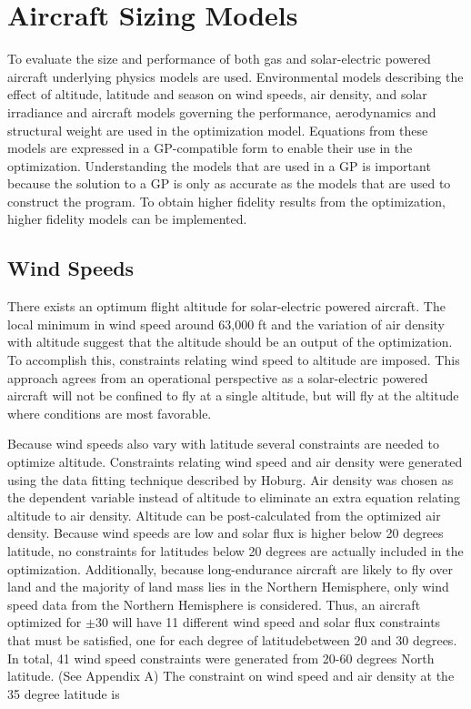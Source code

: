 \documentclass[]{aiaa-tc}%
\begin{document}
\section{Aircraft Sizing Models}

To evaluate the size and performance of both gas and solar-electric powered aircraft underlying physics models are used.  
Environmental models describing the effect of altitude, latitude and season on wind speeds, air density, and solar irradiance and aircraft models governing the performance, aerodynamics and structural weight are used in the optimization model.
Equations from these models are expressed in a GP-compatible form to enable their use in the optimization. 
Understanding the models that are used in a GP is important because the solution to a GP is only as accurate as the models that are used to construct the program.  
To obtain higher fidelity results from the optimization, higher fidelity models can be implemented. 

\subsection{Wind Speeds}

There exists an optimum flight altitude for solar-electric powered aircraft.  
The local minimum in wind speed around 63,000 ft and the variation of air density with altitude suggest that the altitude should be an output of the optimization. 
To accomplish this, constraints relating wind speed to altitude are imposed. 
This approach agrees from an operational perspective as a solar-electric powered aircraft will not be confined to fly at a single altitude, but will fly at the altitude where conditions are most favorable. 

Because wind speeds also vary with latitude several constraints are needed to optimize altitude. 
Constraints relating wind speed and air density were generated using the data fitting technique described by Hoburg\cite{fitting}.
Air density was chosen as the dependent variable instead of altitude to eliminate an extra equation relating altitude to air density. 
Altitude can be post-calculated from the optimized air density. 
Because wind speeds are low and solar flux is higher below 20 degrees latitude, no constraints for latitudes below 20 degrees are actually included in the optimization. 
Additionally, because long-endurance aircraft are likely to fly over land and the majority of land mass lies in the Northern Hemisphere, only wind speed data from the Northern Hemisphere is considered.
Thus, an aircraft optimized for $\pm$30 will have 11 different wind speed and solar flux constraints that must be satisfied, one for each degree of latitudebetween 20 and 30 degrees. 
In total, 41 wind speed constraints were generated from 20-60 degrees North latitude. (See Appendix A) 
The constraint on wind speed and air density at the 35 degree latitude is 
\end{document}

